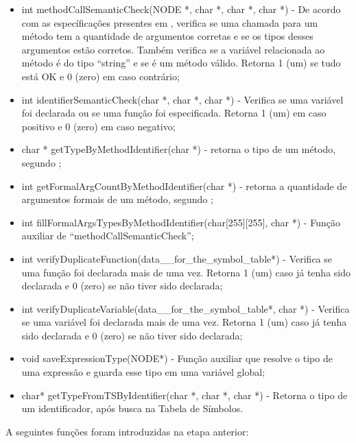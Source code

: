 \documentclass[12pt]{article}
\begin{document}
\begin{itemize}
	\item int methodCallSemanticCheck(NODE *, char *, char *, char *) - De acordo com as específicações presentes em \cite{clrs09}, verifica se uma chamada para um método tem a quantidade de argumentos corretas e se os tipos desses argumentos estão corretos. Também verifica se a variável relacionada ao método é do tipo ``string'' e se é um método válido. Retorna 1 (um) se tudo está OK e 0 (zero) em caso contrário;
	\item int identifierSemanticCheck(char *, char *, char *) - Verifica se uma variável foi declarada ou se uma função foi especificada. Retorna 1 (um) em caso positivo e 0 (zero) em caso negativo;
	\item char * getTypeByMethodIdentifier(char *) - retorna o tipo de um método, segundo \cite{clrs09};
	\item int getFormalArgCountByMethodIdentifier(char *) - retorna a quantidade de argumentos formais de um método, segundo \cite{clrs09};
	\item int fillFormalArgsTypesByMethodIdentifier(char[255][255], char *) - Função auxiliar de ``methodCallSemanticCheck'';
	\item int verifyDuplicateFunction(data\_\_for\_the\_symbol\_table*) - Verifica se uma função foi declarada mais de uma vez. Retorna 1 (um) caso já tenha sido declarada e 0 (zero) se não tiver sido declarada;
	\item int verifyDuplicateVariable(data\_\_for\_the\_symbol\_table*, char *) - Verifica se uma variável foi declarada mais de uma vez. Retorna 1 (um) caso já tenha sido declarada e 0 (zero) se não tiver sido declarada;
	\item void saveExpressionType(NODE*) - Função auxiliar que resolve o tipo de uma expressão e guarda esse tipo em uma variável global;
	\item char* getTypeFromTSByIdentifier(char *, char *, char *) - Retorna o tipo de um identificador, após busca na Tabela de Símbolos.
\end{itemize}

A seguintes funções foram introduzidas na etapa anterior:
\end{document}

